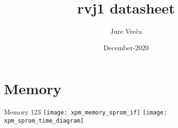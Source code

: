 \documentclass{report}
\title{rvj1 datasheet}
\date{December-2020}
\author{Jure Vre\v{c}a}
\begin{document}
  \maketitle
  \newpage

  \chapter{Memory}
	Memory 123
	\texttt{[image: xpm\_memory\_sprom\_if]}
	\newline
	\texttt{[image: xpm\_sprom\_time\_diagram]}
\end{document}
